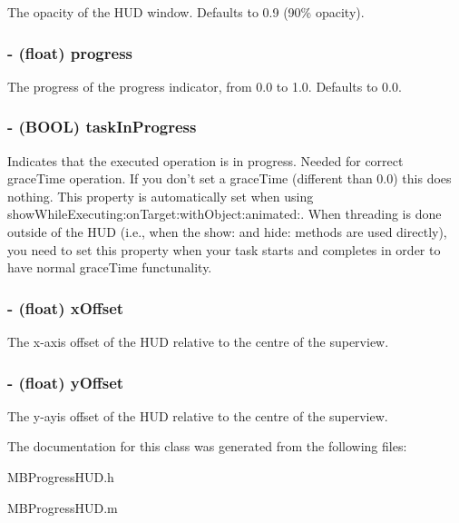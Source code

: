\label{interface_m_b_progress_h_u_d_a24ab5e37917e3489d6add081324a49ff}
The opacity of the HUD window. Defaults to 0.9 (90\% opacity). \hypertarget{interface_m_b_progress_h_u_d_a4c8328617d11efd1f5452032246ca97f}{
\subsubsection[{progress}]{\setlength{\rightskip}{0pt plus 5cm}-\/ (float) progress}}
\label{interface_m_b_progress_h_u_d_a4c8328617d11efd1f5452032246ca97f}
The progress of the progress indicator, from 0.0 to 1.0. Defaults to 0.0. \hypertarget{interface_m_b_progress_h_u_d_a6077ea42c37c18b3058ed63ac10ede8f}{
\subsubsection[{taskInProgress}]{\setlength{\rightskip}{0pt plus 5cm}-\/ (BOOL) taskInProgress}}
\label{interface_m_b_progress_h_u_d_a6077ea42c37c18b3058ed63ac10ede8f}
Indicates that the executed operation is in progress. Needed for correct graceTime operation. If you don't set a graceTime (different than 0.0) this does nothing. This property is automatically set when using showWhileExecuting:onTarget:withObject:animated:. When threading is done outside of the HUD (i.e., when the show: and hide: methods are used directly), you need to set this property when your task starts and completes in order to have normal graceTime functunality. \hypertarget{interface_m_b_progress_h_u_d_a4e6ee114c04b90ced1a253a6d33ba785}{
\subsubsection[{xOffset}]{\setlength{\rightskip}{0pt plus 5cm}-\/ (float) xOffset}}
\label{interface_m_b_progress_h_u_d_a4e6ee114c04b90ced1a253a6d33ba785}
The x-\/axis offset of the HUD relative to the centre of the superview. \hypertarget{interface_m_b_progress_h_u_d_ad526ffcabab5131697eb0850c50ab1f4}{
\subsubsection[{yOffset}]{\setlength{\rightskip}{0pt plus 5cm}-\/ (float) yOffset}}
\label{interface_m_b_progress_h_u_d_ad526ffcabab5131697eb0850c50ab1f4}
The y-\/ayis offset of the HUD relative to the centre of the superview. 

The documentation for this class was generated from the following files:\begin{DoxyCompactItemize}
\item 
MBProgressHUD.h\item 
MBProgressHUD.m\end{DoxyCompactItemize}
